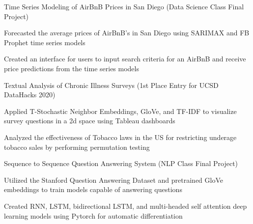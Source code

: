 
\begin{cventries}

\cventry
    {} %
    {Time Series Modeling of AirBnB Prices in San Diego (Data Science Class Final Project)} %
    {} %
    {} %
    {
      \begin{cvitems} %
        \item {Forecasted the average prices of AirBnB's in San Diego using SARIMAX and FB Prophet time series models}
		\item {Created an interface for users to input search criteria for an AirBnB and receive price predictions from the time series models}
      \end{cvitems}
    }

\cventry
    {} %
    {Textual Analysis of Chronic Illness Surveys (1st Place Entry for UCSD DataHacks 2020)} %
    {} %
    {} %
    {
      \begin{cvitems} %
        \item {Applied T-Stochastic Neighbor Embeddings, GloVe, and TF-IDF to visualize survey questions in a 2d space using Tableau dashboards}
		\item {Analyzed the effectiveness of Tobacco laws in the US for restricting underage tobacco sales by performing permutation testing}
      \end{cvitems}
    }
    
\cventry
    {} %
    {Sequence to Sequence Question Answering System (NLP Class Final Project)} %
    {} %
    {} %
    {
      \begin{cvitems} %
        \item {Utilized the Stanford Question Answering Dataset and pretrained GloVe embeddings to train models capable of answering questions}
		\item {Created RNN, LSTM, bidirectional LSTM, and multi-headed self attention deep learning models using Pytorch for automatic differentiation}
      \end{cvitems}
    }
    
\end{cventries}